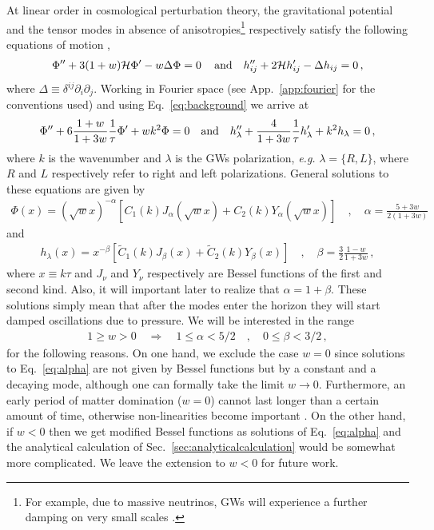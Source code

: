 \documentclass[aps,10pt,prd,groupedaddress,nofootinbib,notitlepage,eqsecnum,preprintnumbers]{revtex4-1}
\begin{document}
At linear order in cosmological perturbation theory, the gravitational potential and the tensor modes in absence of anisotropies\footnote{For example, due to massive neutrinos, GWs will experience a further damping on very small scales \cite{Mangilli:2008bw}.} respectively satisfy the following equations of motion \cite{Kodama:1985bj,Mukhanov:1990me},
\begin{align}
\Phi''+3(1+w){\cal H}\Phi'-w\Delta\Phi=0\,
\quad {\rm and} \quad
h_{ij}''+2{\cal H}h_{ij}'-\Delta h_{ij}=0\,,
\end{align}
where $\Delta\equiv\delta^{ij}\partial_i\partial_j$. Working in Fourier space (see App.~\ref{app:fourier} for the conventions used) and using Eq.~\eqref{eq:background} we arrive at
\begin{align}
\Phi''+6\frac{1+w}{1+3w}\frac{1}{\tau}\Phi'+wk^2\Phi=0\quad {\rm and}\quad h_\lambda''+\frac{4}{1+3w}\frac{1}{\tau}h_\lambda'+k^2h_\lambda=0\,,
\end{align}
where $k$ is the wavenumber and $\lambda$ is the GWs polarization, \textit{e.g.} $\lambda=\{R, L\}$, where $R$ and $L$ respectively refer to right and left polarizations. General solutions to these equations are given by \cite{Baumann:2007zm}
\begin{align}\label{eq:alpha}
\Phi(x)=(\sqrt{w}x)^{-\alpha}\left[C_1(k)J_\alpha(\sqrt{w}x)+C_2(k)Y_\alpha(\sqrt{w}x)\right]\quad,\quad \alpha=\frac{5+3w}{2(1+3w)}
\end{align}
and
\begin{align}\label{eq:beta}
h_\lambda(x)=x^{-\beta}\left[\tilde C_1(k)J_\beta(x)+\tilde C_2(k)Y_\beta(x)\right]\quad,\quad \beta=\frac{3}{2}\frac{1-w}{1+3w}\,,
\end{align}
where $x\equiv k\tau$ and $J_\nu$ and $Y_{\nu}$ respectively are Bessel functions of the first and second kind. Also, it will important later to realize that $\alpha=1+\beta$. These solutions simply mean that after the modes enter the horizon they will start damped oscillations due to pressure. We will be interested in the range
\begin{align}
1\geq w > 0 \quad \Rightarrow \quad 1\leq \alpha< 5/2 \quad,\quad 0\leq \beta< 3/2\,,
\end{align}
for the following reasons. On one hand, we exclude the case $w=0$ since solutions to Eq.~\eqref{eq:alpha} are not given by Bessel functions but by a constant and a decaying mode, although one can formally take the limit $w\to0$. Furthermore, an early period of matter domination ($w=0$) cannot last longer than a certain amount of time, otherwise non-linearities become important \cite{Assadullahi:2009nf,Alabidi:2013wtp,Inomata:2019ivs,Inomata:2019zqy}. On the other hand, if $w<0$ then we get modified Bessel functions as solutions of Eq.~\eqref{eq:alpha} and the analytical calculation of Sec.~\ref{sec:analyticalcalculation} would be somewhat more complicated. We leave the extension to $w<0$ for future work.
\end{document}
